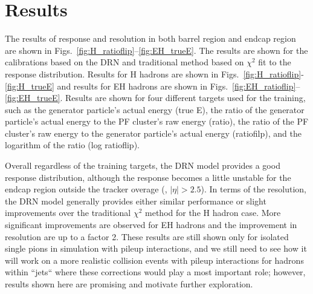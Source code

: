 \section{Results}
The results of response and resolution in both barrel region and endcap region are shown in Figs.~\ref{fig:H_ratioflip}--\ref{fig:EH_trueE}.
The results are shown for the calibrations based on the DRN and traditional method based on $\chi^2$ fit to the response distribution.
Results for H hadrons are shown in Figs.~\ref{fig:H_ratioflip}-\ref{fig:H_trueE} and results for EH hadrons are shown in Figs.~\ref{fig:EH_ratioflip}--\ref{fig:EH_trueE}.
Results are shown for four different targets used for the training, such as the generator particle's actual energy (true E), the ratio of the generator particle's actual energy to the PF cluster's raw energy (ratio), the ratio of the PF cluster's raw energy to the generator particle's actual energy (ratiofilp), and the logarithm of the ratio (log ratioflip). 

Overall regardless of the training targets, the DRN model provides a good response distribution, although the response becomes a little unstable for the endcap region outside the tracker overage (\ie, $|\eta|>2.5$).
In terms of the resolution, the DRN model generally provides either similar performance or slight improvements over the traditional $\chi^2$ method for the H hadron case.
More significant improvements are observed for EH hadrons and the improvement in resolution are up to a factor 2.
These results are still shown only for isolated single pions in simulation with pileup interactions, and we still need to see how it will work on a more realistic collision events with pileup interactions for hadrons within ``jets`` where these corrections would play a most important role; however, results shown here are promising and motivate further exploration.












